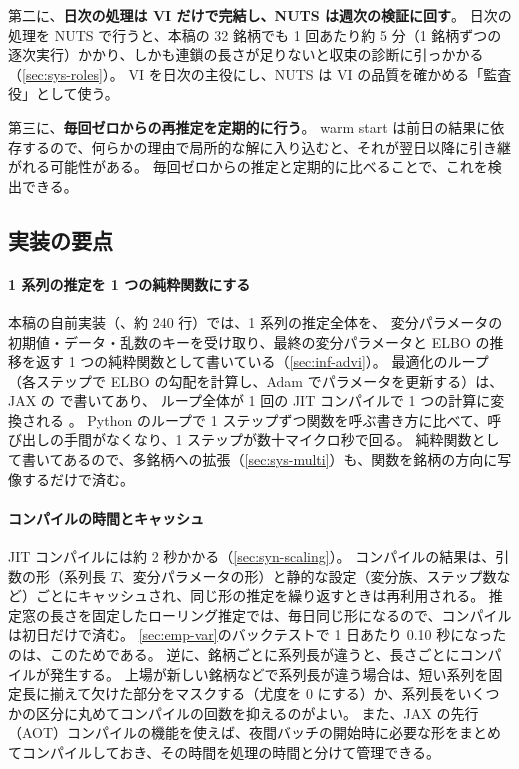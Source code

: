 第二に、\textbf{日次の処理は VI だけで完結し、NUTS は週次の検証に回す}。
日次の処理を NUTS で行うと、本稿の 32 銘柄でも 1 回あたり約 5 分（1 銘柄ずつの逐次実行）かかり、しかも連鎖の長さが足りないと収束の診断に引っかかる（\cref{sec:sys-roles}）。
VI を日次の主役にし、NUTS は VI の品質を確かめる「監査役」として使う。

第三に、\textbf{毎回ゼロからの再推定を定期的に行う}。
warm start は前日の結果に依存するので、何らかの理由で局所的な解に入り込むと、それが翌日以降に引き継がれる可能性がある。
毎回ゼロからの推定と定期的に比べることで、これを検出できる。

\subsection{実装の要点}\label{sec:sys-impl}

\paragraph{1 系列の推定を 1 つの純粋関数にする}
本稿の自前実装（、約 240 行）では、1 系列の推定全体を、
変分パラメータの初期値・データ・乱数のキーを受け取り、最終の変分パラメータと ELBO の推移を返す 1 つの純粋関数として書いている（\cref{sec:inf-advi}）。
最適化のループ（各ステップで ELBO の勾配を計算し、Adam でパラメータを更新する）は、JAX の  で書いてあり、
ループ全体が 1 回の JIT コンパイルで 1 つの計算に変換される \parencite{bradbury2018}。
Python のループで 1 ステップずつ関数を呼ぶ書き方に比べて、呼び出しの手間がなくなり、1 ステップが数十マイクロ秒で回る。
純粋関数として書いてあるので、多銘柄への拡張（\cref{sec:sys-multi}）も、関数を銘柄の方向に写像するだけで済む。

\paragraph{コンパイルの時間とキャッシュ}
JIT コンパイルには約 2 秒かかる（\cref{sec:syn-scaling}）。
コンパイルの結果は、引数の形（系列長 $T$、変分パラメータの形）と静的な設定（変分族、ステップ数など）ごとにキャッシュされ、同じ形の推定を繰り返すときは再利用される。
推定窓の長さを固定したローリング推定では、毎日同じ形になるので、コンパイルは初日だけで済む。
\cref{sec:emp-var}のバックテストで 1 日あたり 0.10 秒になったのは、このためである。
逆に、銘柄ごとに系列長が違うと、長さごとにコンパイルが発生する。
上場が新しい銘柄などで系列長が違う場合は、短い系列を固定長に揃えて欠けた部分をマスクする（尤度を 0 にする）か、系列長をいくつかの区分に丸めてコンパイルの回数を抑えるのがよい。
また、JAX の先行（AOT）コンパイルの機能を使えば、夜間バッチの開始時に必要な形をまとめてコンパイルしておき、その時間を処理の時間と分けて管理できる。

